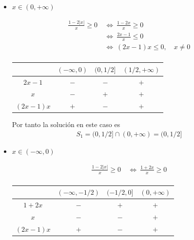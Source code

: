 \documentclass[12pt]{book}
\begin{document}
\begin{itemize}
    \item $x \in (0, +\infty)$

    \begin{align*}
          \frac{1-2|x|}{x} \geq 0 \ &\Longleftrightarrow \ \frac{1-2x}{x}\geq 0 \\
          &\Longleftrightarrow \ \frac{2x-1}{x}\leq 0 \\
          &\Longleftrightarrow \ (2x-1)x\leq 0 , \quad x\neq 0\\
    \end{align*}

    \begin{center}
\begin{tabular}{|c|c|c|c|}
\hline
   & $(-\infty,0) $  & $(0,1/2]$ & $(1/2,+\infty)$ \\
   \hline
   $2x-1$ & $-$ &$-$ &  $+$ \\ \hline
   $x$ & $-$ & $+$ & $+$ \\ \hline \hline
\rule{0pt}{0pt} $\displaystyle (2x-1)x $ & $+$ & $-$ & $+$ \\
   \hline
\end{tabular}
\end{center}
Por tanto la solución en este caso es 
\begin{align*}
    S_1= (0,1/2]\cap (0, +\infty) =(0,1/2]
\end{align*}

\item $x \in (-\infty,0)$

 \begin{align*}
          \frac{1-2|x|}{x} \geq 0 \ &\Longleftrightarrow \ \frac{1+2x}{x}\geq 0 \\
\end{align*}

    
    \begin{center}
\begin{tabular}{|c|c|c|c|}
\hline
   & $(-\infty,-1/2) $  & $(-1/2,0]$ & $(0,+\infty)$ \\
   \hline
   $1+2x$ & $-$ &$+$ &  $+$ \\ \hline
   $x$ & $-$ & $-$ & $+$ \\ \hline \hline
\rule{0pt}{0pt} $\displaystyle (2x-1)x $ & $+$ & $-$ & $+$ \\
   \hline
\end{tabular}
\end{center}
\end{itemize}
\end{document}
